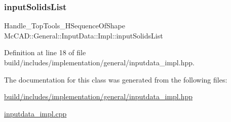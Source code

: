 \subsubsection{\texorpdfstring{input\+Solids\+List}{inputSolidsList}}
{\footnotesize\ttfamily Handle\+\_\+\+Top\+Tools\+\_\+\+H\+Sequence\+Of\+Shape Mc\+C\+A\+D\+::\+General\+::\+Input\+Data\+::\+Impl\+::input\+Solids\+List}



Definition at line 18 of file build/includes/implementation/general/inputdata\+\_\+impl.\+hpp.



The documentation for this class was generated from the following files\+:\begin{DoxyCompactItemize}
\item 
\hyperlink{build_2includes_2implementation_2general_2inputdata__impl_8hpp}{build/includes/implementation/general/inputdata\+\_\+impl.\+hpp}\item 
\hyperlink{inputdata__impl_8cpp}{inputdata\+\_\+impl.\+cpp}\end{DoxyCompactItemize}

